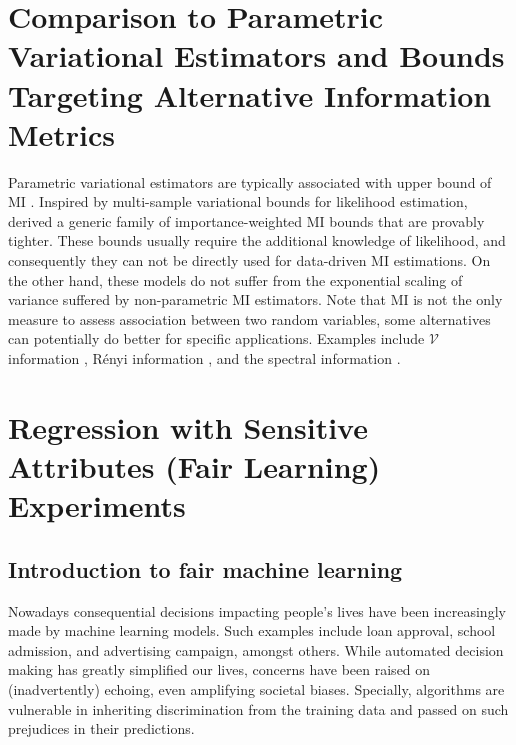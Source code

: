 \documentclass{article}
\theoremstyle{plain}
\theoremstyle{definition}
\theoremstyle{remark}
\newcommand{\CV}{\mathcal{V}}
\begin{document}
			
			
			
			
			\section{Comparison to Parametric Variational Estimators and Bounds Targeting Alternative Information Metrics}
			\label{sec:alt-appendix}
			
			
			Parametric variational estimators are typically associated with upper bound of MI \citep{cheng2020club,poole2019variational}. Inspired by multi-sample variational bounds for likelihood estimation, \citep{brekelmans2021improving} derived a generic family of importance-weighted MI bounds that are provably tighter. These bounds usually require the additional knowledge of likelihood, and consequently they can not be directly used for data-driven MI estimations. On the other hand, these models do not suffer from the exponential scaling of variance suffered by non-parametric MI estimators. Note that MI is not the only measure to assess association between two random variables, some alternatives can potentially do better for specific applications. Examples include $\CV$ information \citep{xu2020theory}, R\'enyi information \citep{lee2022r}, and the spectral information \citep{haochen2021provable}. 
			
			\section{Regression with Sensitive Attributes (Fair Learning) Experiments}
			
			\subsection{Introduction to fair machine learning}
			Nowadays consequential decisions impacting people's lives have been increasingly made by machine learning models. Such examples include loan approval, school admission, and advertising campaign, amongst others. While automated decision making has greatly simplified our lives, concerns have been raised on (inadvertently) echoing, even amplifying societal biases. Specially, algorithms are vulnerable in inheriting discrimination from the training data and passed on such prejudices in their predictions. 
			
\end{document}
